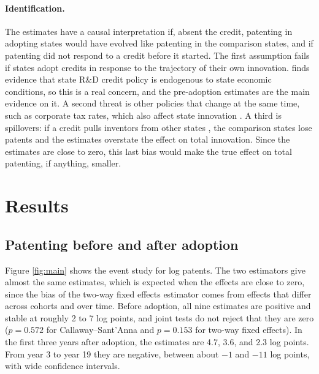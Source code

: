 \documentclass[12pt]{article}
\begin{document}
\paragraph{Identification.} The estimates have a causal interpretation if, absent the credit, patenting in
adopting states would have evolved like patenting in the comparison states, and if patenting did not respond
to a credit before it started. The first assumption fails if states adopt credits in response to the
trajectory of their own innovation. \citet{chang2018endogeneity} finds evidence that state R\&D credit policy is
endogenous to state economic conditions, so this is a real concern, and the pre-adoption estimates are the main evidence on
it. A second threat is other policies that change at the same time, such as corporate tax rates, which also
affect state innovation \citep{mukherjee2017taxes,akcigit2022taxation}. A third is spillovers: if a credit pulls
inventors from other states \citep{wilson2009beggar,moretti2014state}, the comparison states lose patents and the
estimates overstate the effect on total innovation. Since the estimates are close to zero, this last bias
would make the true effect on total patenting, if anything, smaller.

\section{Results}\label{sec:results}

\subsection{Patenting before and after adoption}

Figure \ref{fig:main} shows the event study for log patents. The two estimators give almost the same estimates,
which is expected when the effects are close to zero, since the bias of the two-way fixed effects estimator
comes from effects that differ across cohorts and over time. Before adoption, all nine estimates are positive
and stable at roughly 2 to 7 log points, and joint tests do not reject that they are zero
($p = 0.572$ for Callaway--Sant'Anna and $p = 0.153$ for two-way fixed effects). In the first three years after
adoption, the estimates are 4.7, 3.6, and 2.3 log points. From year 3 to year 19 they are negative, between
about $-1$ and $-11$ log points, with wide confidence intervals.
\end{document}
